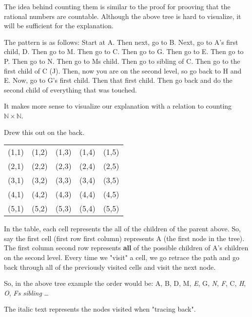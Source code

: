 \documentclass[12pt]{article}
\begin{document}
The idea behind counting them is similar to the proof for prooving that the rational numbers are
countable. Although the above tree is hard to visualize, it will be sufficient for the explanation.

The pattern is as follows: Start at A. Then next, go to B. Next, go to A's first child, D. Then go to 
M. Then go to C. Then go to G. Then go to E. Then go to P. Then go to N. Then go to Ms child. Then go to
sibling of C. Then go to the first child of C (J). Then, now you are on the second level, so 
go back to H and E. Now, go to G's first child. Then that first child. Then go back and do the second child
of everything that was touched. 


It makes more sense to visualize our explanation with a relation to counting $\mathbb{N} \times \mathbb{N}$. 

Drew this out on the back.

\pagebreak


\begin{tabular}{ |c|c|c|c|c| } 
	\hline
	(1,1) & (1,2) & (1,3) & (1,4) & (1,5) \\ 
	(2,1) & (2,2) & (2,3) & (2,4) & (2,5) \\ 
	(3,1) & (3,2) & (3,3) & (3,4) & (3,5) \\ 
	(4,1) & (4,2) & (4,3) & (4,4) & (4,5) \\ 
	(5,1) & (5,2) & (5,3) & (5,4) & (5,5) \\ 
	\hline
\end{tabular}

\vskip 3cm

In the table, each cell represents the all of the children of the parent above. So, say the first 
cell (first row first column) represents A (the first node in the tree). The first
column second row represents \textbf{all} of the possible children of A's children on the second level. 
Every time we "visit" a cell, we go retrace the path and go back through all of the previously visited cells 
and visit the next node.  

So, in the above tree example the order would be: A, B, D, M, \textit{E}, G, \textit{N}, \textit{F}, C, \textit{H}, \textit{O}, \textit{Fs sibling} \ldots 

The italic text represents the nodes visited when "tracing back".
\end{document}
